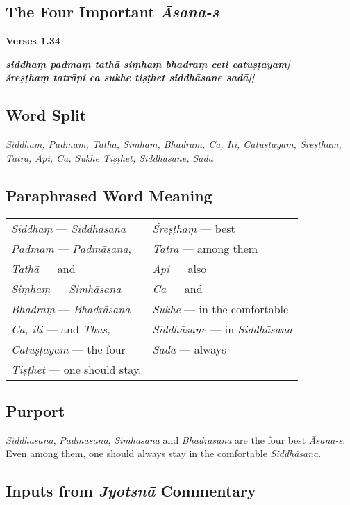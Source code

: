 \subsection*{The Four Important \textit{Āsana-s}}

\noindent 
\textbf{Verses 1.34}

\begin{shloka}
\textit{\textbf{siddhaṃ padmaṃ tathā siṃhaṃ bhadraṃ ceti catuṣṭayam|}\\
\textbf{śreṣṭhaṃ tatrāpi ca sukhe tiṣṭhet siddhāsane sadā||}}
\end{shloka}

\subsection*{Word Split}

\textit{Siddham, Padmam, Tathā, Siṃham, Bhadram, Ca, Iti, Catuṣṭayam, Śreṣṭham, Tatra, Api, Ca, Sukhe Tiṣṭhet, Siddhāsane, Sadā}

\subsection*{Paraphrased Word Meaning}

\begin{longtable}{>{\noindent\raggedright}p{5cm}>{\noindent\raggedright}p{5cm}}
\textit{Siddhaṃ} --- \textit{Siddhāsana} & \textit{Śreṣṭhaṃ} --- best\tabularnewline
\textit{Padmaṃ} --- \textit{Padmāsana},  & \textit{Tatra} --- among them\tabularnewline
\textit{Tathā} --- and & \textit{Api} --- also\tabularnewline
\textit{Siṃhaṃ} --- \textit{Simhāsana} & \textit{Ca} --- and\tabularnewline
\textit{Bhadraṃ} --- \textit{Bhadrāsana} & \textit{Sukhe} --- in the comfortable\tabularnewline
\textit{Ca, iti} --- and \textit{Thus,}  & \textit{Siddhāsane} --- in \textit{Siddhāsana}\tabularnewline
\textit{Catuṣṭayam} --- the four & \textit{Sadā} --- always\tabularnewline
\textit{Tiṣṭhet} --- one should stay. &
\end{longtable}

\subsection*{Purport}

\textit{Siddhāsana}, \textit{Padmāsana}, \textit{Simhāsana} and \textit{Bhadrāsana} are the four best \textit{Āsana-s}. Even among them, one should always stay in the comfortable \textit{Siddhāsana}.

\subsection*{Inputs from \textit{Jyotsnā} Commentary}

